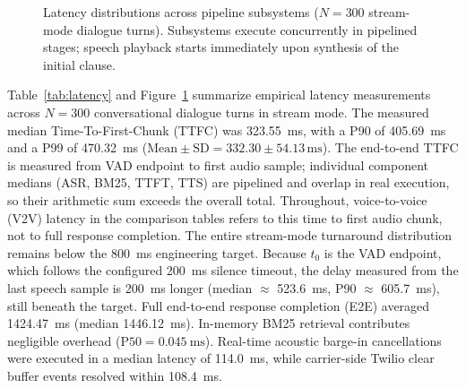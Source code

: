 \documentclass[review,12pt,times,authoryear]{elsarticle}
\theoremstyle{definition}
\begin{document}
\begin{figure}[t]
\centering
{}
\caption{Latency distributions across pipeline subsystems ($N=300$ stream-mode dialogue turns). Subsystems execute concurrently in pipelined stages; speech playback starts immediately upon synthesis of the initial clause.}
\label{fig:latency_box}
\end{figure}
Table~\ref{tab:latency} and Figure~\ref{fig:latency_box} summarize empirical latency measurements across $N=300$ conversational dialogue turns in stream mode. The measured median Time-To-First-Chunk (TTFC) was \SI{323.55}{\milli\second}, with a P90 of \SI{405.69}{\milli\second} and a P99 of \SI{470.32}{\milli\second} ($\text{Mean} \pm \text{SD} = 332.30 \pm 54.13\,\text{ms}$). The end-to-end TTFC is measured from VAD endpoint to first audio sample; individual component medians (ASR, BM25, TTFT, TTS) are pipelined and overlap in real execution, so their arithmetic sum exceeds the overall total. Throughout, voice-to-voice (V2V) latency in the comparison tables refers to this time to first audio chunk, not to full response completion. The entire stream-mode turnaround distribution remains below the \SI{800}{\milli\second} engineering target. Because $t_0$ is the VAD endpoint, which follows the configured \SI{200}{\milli\second} silence timeout, the delay measured from the last speech sample is \SI{200}{\milli\second} longer (median $\approx$ \SI{523.6}{\milli\second}, P90 $\approx$ \SI{605.7}{\milli\second}), still beneath the target. Full end-to-end response completion (E2E) averaged \SI{1424.47}{\milli\second} (median \SI{1446.12}{\milli\second}). In-memory BM25 retrieval contributes negligible overhead ($\mathrm{P50} = \SI{0.045}{\milli\second}$). Real-time acoustic barge-in cancellations were executed in a median latency of \SI{114.0}{\milli\second}, while carrier-side Twilio clear buffer events resolved within \SI{108.4}{\milli\second}.
\end{document}
